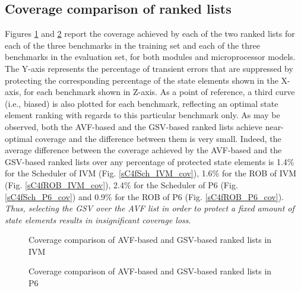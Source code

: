 \documentclass[12pt]{yalephd}
\begin{document}
\subsection{Coverage comparison of ranked lists}

Figures \ref{sC4fCROC_ranking_IVM} and \ref{sC4fCROC_ranking_P6} report the coverage achieved by each of the two ranked lists for each of the three benchmarks in the training set and each of the three benchmarks in the evaluation set, for both modules and microprocessor models. The Y-axis represents the percentage of transient errors that are suppressed by protecting the corresponding percentage of the state elements shown in the X-axis, for each benchmark shown in Z-axis. As a point of reference, a third curve (i.e., biased) is also plotted for each benchmark, reflecting an optimal state element ranking with regards to this particular benchmark only. As may be observed, both the AVF-based and the GSV-based ranked lists achieve near-optimal coverage and the difference between them is very small. Indeed, the average difference between the coverage achieved by the AVF-based and the GSV-based ranked lists over any percentage of protected state elements is 1.4\% for the Scheduler of IVM (Fig. \ref{sC4fSch_IVM_cov}), 1.6\% for the ROB of IVM (Fig. \ref{sC4fROB_IVM_cov}), 2.4\% for the Scheduler of P6 (Fig. \ref{sC4fSch_P6_cov}) and 0.9\% for the ROB of P6 (Fig. \ref{sC4fROB_P6_cov}). {\em Thus, selecting the GSV over the AVF list in order to protect a fixed amount of state elements results in insignificant coverage loss}.

\begin{figure}[!ht]
    \centering
        \vspace{.5in}
\caption{Coverage comparison of AVF-based and GSV-based ranked lists in IVM}
\label{sC4fCROC_ranking_IVM}
\end{figure}

\begin{figure}[!ht]
    \centering
        \vspace{.5in}
\vspace{.3in}
\caption{Coverage comparison of AVF-based and GSV-based ranked lists in P6}
\label{sC4fCROC_ranking_P6}
\end{figure}
\end{document}
